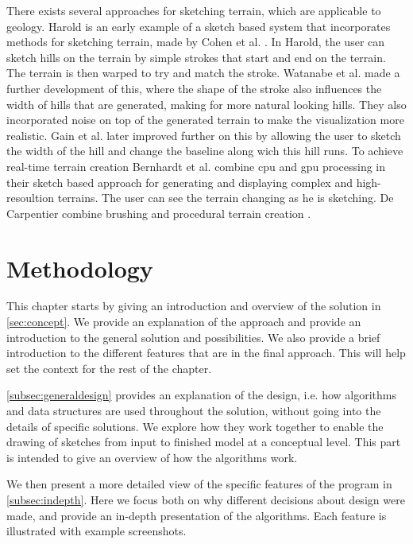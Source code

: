 \documentclass[a4paper,12pt]{report}
\newcommand{\secref}[1]{\autoref{#1}}
\begin{document}
There exists several approaches for sketching terrain, which are applicable to geology. Harold is an early example of a sketch based system that incorporates methods for sketching terrain, made by Cohen et al. \cite{cohen2000harold}. In Harold, the user can sketch hills on the terrain by simple strokes that start and end on the terrain. The terrain is then warped to try and match the stroke. Watanabe et al.  \cite{Watanabe:2004:SIT:1186415.1186500} made a further development of this, where the shape of the stroke also influences the width of hills that are generated, making for more natural looking hills. They also incorporated noise on top of the generated terrain to make the visualization more realistic. Gain et al. \cite{Gain:2009:TS:1507149.1507155} later improved further on this by allowing the user to sketch the width of the hill and change the baseline along wich this hill runs. To achieve real-time terrain creation Bernhardt et al. combine cpu and gpu processing in their sketch based approach for generating and displaying complex and high-resoultion terrains. The user can see the terrain changing as he is sketching. De Carpentier combine brushing and procedural terrain creation \cite{de2009interactive}.


\clearpage




\clearpage


\chapter{Methodology}
\label{sec:method}
This chapter starts by giving an introduction and overview of the solution in \secref{sec:concept}. We provide an explanation of the approach and provide an introduction to the general solution and possibilities. We also provide a brief introduction to the different features  that are in the final approach. This will help set the context for the rest of the chapter.

\secref{subsec:generaldesign} provides an explanation of the design, i.e. how algorithms and data structures are used throughout the solution, without going into the details of specific solutions. We explore how they work together to enable the drawing of sketches from input to finished model at a conceptual level. This part is intended to give an overview of how the algorithms work.

 We then present a more detailed view of the specific features of the program in \secref{subsec:indepth}. Here we focus both on why different decisions about design were made, and provide an in-depth presentation of the algorithms. Each feature is illustrated with example screenshots.
\end{document}
